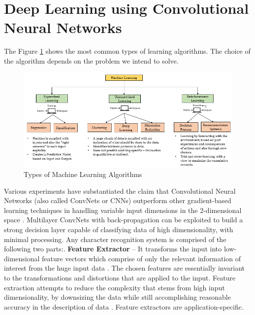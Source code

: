 \section{Deep Learning using Convolutional Neural Networks}
\label{4_1}
The Figure \ref{fig:ML_Classification} shows the most common types of learning algorithms. The choice of the algorithm depends on the problem we intend to solve.
\begin{figure}[h!]
  \includegraphics[width=\linewidth]{figures/ML_Classification.PNG}
  \caption{Types of Machine Learning Algorithms
  \cite{upx_ml}}
  \label{fig:ML_Classification}
\end{figure}
\newline Various experiments have substantiated the claim that Convolutional Neural Networks (also called ConvNets or CNNs) outperform other gradient-based learning techniques in handling variable input dimensions in the 2-dimensional space \cite{lecun1998gradient}.
Multilayer ConvNets with back-propagation can be exploited to build a strong decision layer capable of classifying data of high dimensionality, with minimal processing. \newline \newline
Any character recognition system is comprised of the following two parts:.	\textbf{Feature Extractor }– \newline
It transforms the input into low-dimensional feature vectors which comprise of only the relevant information of interest from the huge input data \cite{wiki_fe}. The chosen features are essentially invariant to the transformations and distortions that are applied to the input. 
\newline
Feature extraction attempts to reduce the complexity that stems from high input dimensionality, by downsizing the data while still accomplishing reasonable accuracy in the description of data \cite{wiki_fe}. Feature extractors are application-specific.\newline \newline
